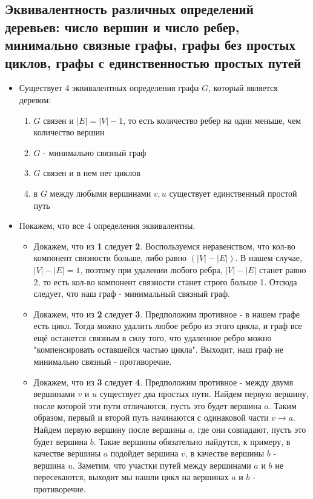 \documentclass{article}
\begin{document}
    \subsection{Эквивалентность различных определений деревьев: число вершин и число ребер, минимально связные графы, графы без простых циклов, графы с единственностью простых путей}
    \begin{itemize}
        \item
        Существует 4 эквивалентных определения графа $G$, который является деревом:
        \begin{enumerate}
        \item $G$ связен и $|E| = |V| - 1$, то есть количество ребер на один меньше, чем количество вершин
        \item $G$ - минимально связный граф
        \item $G$ связен и в нем нет циклов
        \item в $G$ между любыми вершинами $v, u$ существует единственный простой путь
        \end{enumerate}

        \item Покажем, что все 4 определения эквивалентны. 
        \begin{itemize}
        \item
        Докажем, что из \textbf{1} следует \textbf{2}. Воспользуемся неравенством, что кол-во компонент связности больше, либо равно $(|V| - |E|)$. В нашем случае, $|V| - |E| = 1$, поэтому при удалении любого ребра, $|V| - |E|$ станет равно $2$, то есть кол-во компонент связности станет строго больше 1. Отсюда следует, что наш граф - минимальный связный граф. 

        \item
        Докажем, что из \textbf{2} следует \textbf{3}. Предположим противное - в нашем графе есть цикл. Тогда можно удалить любое ребро из этого цикла, и граф все ещё останется связным в силу того, что удаленное ребро можно "компенсировать оставшейся частью цикла". Выходит, наш граф не минимально связный - противоречие. 

        \item
        Докажем, что из \textbf{3} следует \textbf{4}. Предположим противное - между двумя вершинами $v$ и $u$ существует два простых пути. Найдем первую вершину, после которой эти пути отличаются, пусть это будет вершина $a$. Таким образом, первый и второй путь начинаются с одинаковой части $v \to a$. Найдем первую вершину после вершины $a$, где они совпадают, пусть это будет вершина $b$. Такие вершины обязательно найдутся, к примеру, в качестве вершины $a$ подойдет вершина $v$, в качестве вершины $b$ - вершина $u$. Заметим, что участки путей между вершинами $a$ и $b$ не пересекаются, выходит мы нашли цикл на вершинах $a$ и $b$ - противоречие. 


\end{itemize}
\end{itemize}
\end{document}
